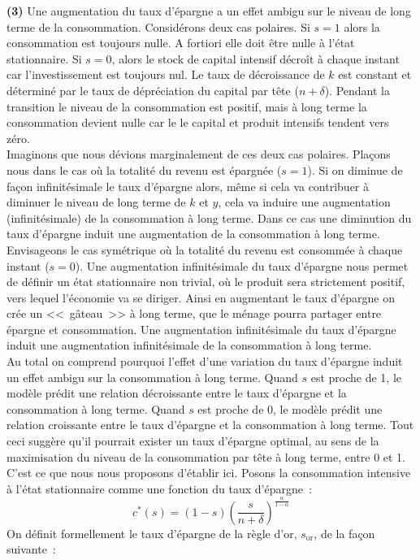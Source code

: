 \documentclass[10pt,a4paper,notitlepage,onecolumn]{article}
\newcommand{\question}[1]{\textbf{(#1)}}
\begin{document}
\question{3} Une augmentation du taux d'épargne a un effet
ambigu sur le niveau de long terme de la consommation. Considérons
deux cas polaires. Si $s=1$ alors la consommation est toujours
nulle. A fortiori elle doit être nulle à l'état stationnaire. Si
$s=0$, alors le stock de capital intensif décroît à chaque instant
car l'investissement est toujours nul. Le taux de décroissance de
$k$ est constant et déterminé par le taux de dépréciation du capital
par tête ($n+\delta$). Pendant la transition le niveau de la
consommation est positif, mais à long terme la consommation devient
nulle car le le capital et produit intensifs tendent vers zéro.\\
Imaginons que nous dévions marginalement de ces deux cas polaires.
Pla\-çons nous dans le cas où la totalité du revenu est épargnée
($s=1$). Si on diminue de façon infinitésimale le taux d'épargne
alors, même si cela va contribuer à diminuer le niveau de long terme
de $k$ et $y$, cela va induire une augmentation (infinitésimale) de
la consommation à long terme. Dans ce cas une diminution du taux
d'épargne induit une augmentation de la consommation à long terme.
Envisageons le cas symétrique où la totalité du revenu est consommée
à chaque instant ($s=0$). Une augmentation infinitésimale du taux
d'épargne nous permet de définir un état stationnaire non trivial,
où le produit sera strictement positif, vers lequel l'économie va se
diriger. Ainsi en augmentant le taux d'épargne on crée un <<~gâteau~>>
à long terme, que le ménage pourra partager entre épargne et
consommation. Une augmentation infinitésimale du taux d'épargne
induit une augmentation infinitésimale de la consommation à long
terme.\\ Au total on comprend pourquoi l'effet d'une variation du
taux d'épargne induit un effet ambigu sur la consommation à long
terme. Quand $s$ est proche de 1, le modèle prédit une relation
décroissante entre le taux d'épargne et la consommation à long
terme. Quand $s$ est proche de 0, le modèle prédit une relation
croissante entre le taux d'épargne et la consommation à long terme.
Tout ceci suggère qu'il pourrait exister un taux d'épargne optimal,
au sens de la maximisation du niveau de la consommation par tête à
long terme, entre 0 et 1. C'est ce que nous nous proposons d'établir
ici. Posons la consommation intensive à l'état stationnaire comme
une fonction du taux d'épargne~:
\[
c^{\ast}(s) =
(1-s)\left(\frac{s}{n+\delta}\right)^{\frac{\alpha}{1-\alpha}}
\]
On définit formellement le taux d'épargne de la règle d'or,
$s_{\mathrm{or}}$, de la façon suivante~:
\end{document}
